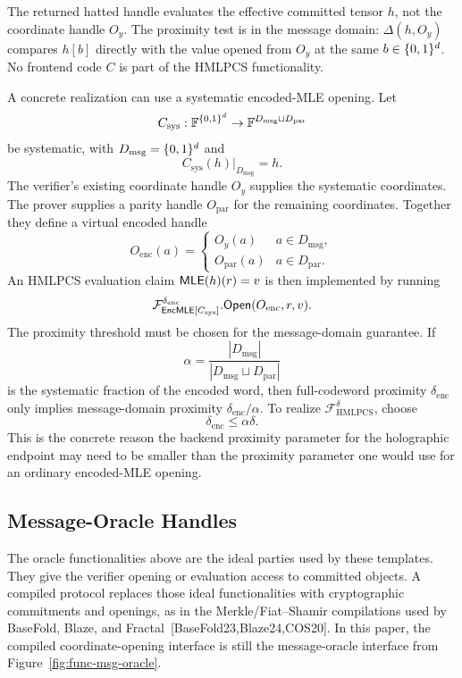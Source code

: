 The returned hatted handle evaluates the effective committed tensor \(h\), not
the coordinate handle \(O_y\).  The proximity test is in the message domain:
\(\Delta(h,O_y)\) compares \(h[b]\) directly with the value opened from
\(O_y\) at the same \(b\in\{0,1\}^d\).  No frontend code \(C\) is part of the
HMLPCS functionality.

A concrete realization can use a systematic encoded-MLE opening.  Let
\[
  C_{\mathrm{sys}}:\mathbb{F}^{\{0,1\}^d}\to\mathbb{F}^{D_{\mathrm{msg}}\sqcup D_{\mathrm{par}}}
\]
be systematic, with \(D_{\mathrm{msg}}=\{0,1\}^d\) and
\[
  C_{\mathrm{sys}}(h)|_{D_{\mathrm{msg}}}=h.
\]
The verifier's existing coordinate handle \(O_y\) supplies the systematic
coordinates.  The prover supplies a parity handle \(O_{\mathrm{par}}\) for the
remaining coordinates.  Together they define a virtual encoded handle
\[
  O_{\mathrm{enc}}(a)=
  \begin{cases}
    O_y(a) & a\in D_{\mathrm{msg}},\\
    O_{\mathrm{par}}(a) & a\in D_{\mathrm{par}}.
  \end{cases}
\]
An HMLPCS evaluation claim \(\mathsf{MLE}(h)(r)=v\) is then implemented by running
\[
  \mathcal F_{\mathsf{EncMLE}[C_{\mathrm{sys}}]}^{\delta_{\mathrm{enc}}}
    .\mathsf{Open}(O_{\mathrm{enc}},r,v).
\]
The proximity threshold must be chosen for the message-domain guarantee.  If
\[
  \alpha=
  \frac{|D_{\mathrm{msg}}|}
       {|D_{\mathrm{msg}}\sqcup D_{\mathrm{par}}|}
\]
is the systematic fraction of the encoded word, then full-codeword proximity
\(\delta_{\mathrm{enc}}\) only implies message-domain proximity
\(\delta_{\mathrm{enc}}/\alpha\).  To realize
\(\mathcal F_{\mathrm{HMLPCS}}^\delta\), choose
\[
  \delta_{\mathrm{enc}}\le \alpha\delta.
\]
This is the concrete reason the backend proximity parameter for the
holographic endpoint may need to be smaller than the proximity parameter one
would use for an ordinary encoded-MLE opening.

\subsection{Message-Oracle Handles}

The oracle functionalities above are the ideal parties used by these templates.
They give the verifier opening or evaluation access to committed objects.
A compiled protocol replaces those ideal functionalities with cryptographic
commitments and openings, as in the Merkle/Fiat--Shamir compilations used by
BaseFold, Blaze, and Fractal~[BaseFold23,Blaze24,COS20].  In this paper, the
compiled coordinate-opening interface is still the message-oracle interface from
Figure~\ref{fig:func-msg-oracle}.

